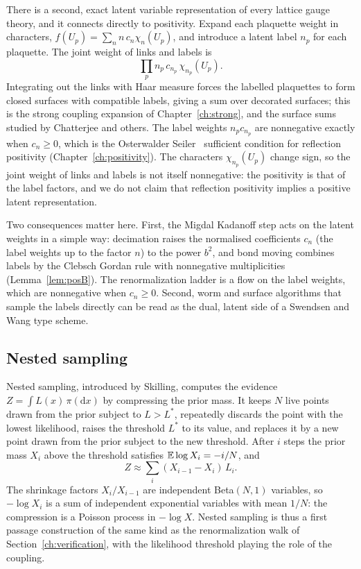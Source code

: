 There is a second, exact latent variable representation of every lattice gauge theory, and it connects directly to positivity. Expand each plaquette weight in characters, $f(U_p)=\sum_nn\,c_n\chi_n(U_p)$, and introduce a latent label $n_p$ for each plaquette. The joint weight of links and labels is
\[
\prod_p n_p\,c_{n_p}\,\chi_{n_p}(U_p).
\]
Integrating out the links with Haar measure forces the labelled plaquettes to form closed surfaces with compatible labels, giving a sum over decorated surfaces; this is the strong coupling expansion of Chapter~\ref{ch:strong}, and the surface sums studied by Chatterjee \cite{Ch19so,Ch19} and others. The label weights $n_pc_{n_p}$ are nonnegative exactly when $c_n\ge0$, which is the Osterwalder Seiler~\cite{OSe} sufficient condition for reflection positivity (Chapter~\ref{ch:positivity}). The characters $\chi_{n_p}(U_p)$ change sign, so the joint weight of links and labels is not itself nonnegative: the positivity is that of the label factors, and we do not claim that reflection positivity implies a positive latent representation.

Two consequences matter here. First, the Migdal Kadanoff step acts on the latent weights in a simple way: decimation raises the normalised coefficients $c_n$ (the label weights up to the factor $n$) to the power $b^2$, and bond moving combines labels by the Clebsch Gordan rule with nonnegative multiplicities (Lemma~\ref{lem:posB}). The renormalization ladder is a flow on the label weights, which are nonnegative when $c_n\ge0$. Second, worm and surface algorithms that sample the labels directly can be read as the dual, latent side of a Swendsen and Wang type scheme.

\subsection{Nested sampling}

Nested sampling, introduced by Skilling, computes the evidence $Z=\int L(x)\,\pi(\mathrm dx)$ by compressing the prior mass. It keeps $N$ live points drawn from the prior subject to $L>L^*$, repeatedly discards the point with the lowest likelihood, raises the threshold $L^*$ to its value, and replaces it by a new point drawn from the prior subject to the new threshold. After $i$ steps the prior mass $X_i$ above the threshold satisfies $\mathbb{E}\log X_i=-i/N$, and
\[
Z\approx\sum_i(X_{i-1}-X_i)\,L_i .
\]
The shrinkage factors $X_i/X_{i-1}$ are independent Beta$(N,1)$ variables, so $-\log X_i$ is a sum of independent exponential variables with mean $1/N$: the compression is a Poisson process in $-\log X$. Nested sampling is thus a first passage construction of the same kind as the renormalization walk of Section~\ref{ch:verification}, with the likelihood threshold playing the role of the coupling.

